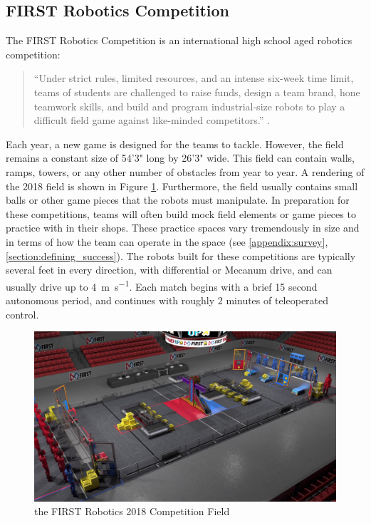 \documentclass{article}
\begin{document}
  \subsection{FIRST Robotics Competition} \label{section:frc}

    The FIRST Robotics Competition is an international high school aged robotics competition:
    \begin{quotation}
      ``Under strict rules, limited resources, and an intense six-week time limit, teams of students are challenged to raise funds, design a team brand, hone teamwork skills, and build and program industrial-size robots to play a difficult field game against like-minded competitors.'' \cite{kamen_first_2015}.
    \end{quotation}

    Each year, a new game is designed for the teams to tackle. However, the field remains a constant size of 54'3" long by 26'3" wide. This field can contain walls, ramps, towers, or any other number of obstacles from year to year. A rendering of the 2018 field is shown in Figure \ref{fig:frc_field}. Furthermore, the field usually contains small balls or other game pieces that the robots must manipulate. In preparation for these competitions, teams will often build mock field elements or game pieces to practice with in their shops. These practice spaces vary tremendously in size and in terms of how the team can operate in the space (see \ref{appendix:survey}, \ref{section:defining_success}). The robots built for these competitions are typically several feet in every direction, with differential or Mecanum drive, and can usually drive up to \SI{4}{\meter\per\second}. Each match begins with a brief 15 second autonomous period, and continues with roughly 2 minutes of teleoperated control.

    \begin{figure}[H]
      \centering
      \includegraphics[width=0.75\linewidth]{./images/FIRST_2018_field.jpg}
      \caption{the FIRST Robotics 2018 Competition Field}
      \label{fig:frc_field}
    \end{figure}
\end{document}
